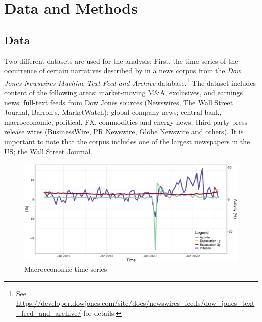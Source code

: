 \section{Data and Methods}\label{sec:MethodsData}

\subsection{Data}\label{subsec:Data}

Two different datasets are used for the analysis: First, the time series of the occurrence of certain narratives described by \cite{Andre.2023} in a news corpus from the \textit{Dow Jones Newswires Machine Text Feed and Archive} database.\footnote{See  \url{https://developer.dowjones.com/site/docs/newswires_feeds/dow_jones_text_feed_and_archive/} for details.} The dataset includes content of the following areas: market-moving M\&A, exclusives, and earnings news; full-text feeds from Dow Jones sources (Newswires, The Wall Street Journal, Barron's, MarketWatch); global company news; central bank, macroeconomic, political, FX, commodities and energy news; third-party press release wires (BusinessWire, PR Newswire, Globe Newswire and others). It is important to note that the corpus includes one of the largest newspapers in the US; the Wall Street Journal.

\begin{figure}[H]
	\includegraphics[width=1\linewidth]{figures/all_data.eps}
	\caption{Macroeconomic time series}
	\label{fig:alldata}
\end{figure}


